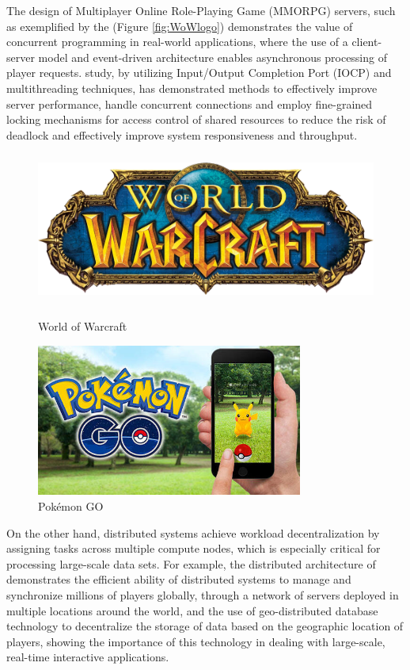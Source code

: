 \documentclass{l4proj}
\begin{document}
The design of Multiplayer Online Role-Playing Game (MMORPG) servers, such as exemplified by the \cite{glenday_guinness} (Figure \ref{fig:WoWlogo}) demonstrates the value of concurrent programming in real-world applications, where the use of a client-server model and event-driven architecture enables asynchronous processing of player requests. \cite{kim_2018_design} study, by utilizing Input/Output Completion Port (IOCP) and multithreading techniques, has demonstrated methods to effectively improve server performance, handle concurrent connections and employ fine-grained locking mechanisms for access control of shared resources to reduce the risk of deadlock and effectively improve system responsiveness and throughput.

\begin{figure}[h]
    \centering
    \begin{minipage}[t]{0.35\textwidth}
        \centering
        \includegraphics[width=\linewidth,height=5cm,keepaspectratio]{images/WoWlogo.png}
        \caption{World of Warcraft}
        \label{fig:WoWlogo}
    \end{minipage}
    \quad
    \begin{minipage}[t]{0.30\textwidth}
        \centering
        \includegraphics[width=\linewidth,height=5cm,keepaspectratio]{images/PokemonGo.jpeg}
        \caption{Pokémon GO}
        \label{fig:PokemonGo}
    \end{minipage}
\end{figure}

On the other hand, distributed systems achieve workload decentralization by assigning tasks across multiple compute nodes, which is especially critical for processing large-scale data sets. For example, the distributed architecture of \cite{wikipediacontributors_2019_pokmon} demonstrates the efficient ability of distributed systems to manage and synchronize millions of players globally, through a network of servers deployed in multiple locations around the world, and the use of geo-distributed database technology to decentralize the storage of data based on the geographic location of players, showing the importance of this technology in dealing with large-scale, real-time interactive applications.
		
\end{document}
